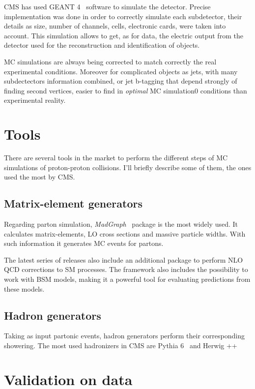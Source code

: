 CMS has used GEANT 4~\cite{Agostinelli:2002hh} software to simulate the detector. Precise implementation was done in order to correctly simulate each subdetector, their details as size, number of channels, cells, electronic cards, were taken into account. This simulation allows to get, as for data, the electric output from the detector used for the reconstruction and identification of objects. 

MC simulations are always being corrected to match correctly the real experimental conditions. Moreover for complicated objects as jets, with many subdectectors information combined, or jet b-tagging that depend strongly of finding second vertices, easier to find in \textit{optimal} MC simulation0 conditions than experimental reality.

\section{Tools}
\label{sec:tools}

There are several tools in the market to perform the different steps of MC simulations of proton-proton collisions. I'll briefly describe some of them, the ones used the most by CMS.

\subsection{Matrix-element generators}
\label{sec:ME}

Regarding parton simulation, \textit{MadGraph}~\cite{Alwall:2014hca} package is the most widely used. It calculates matrix-elements, LO cross sections and massive particle widths. With such information it generates MC events for partons. 

The latest series of releases also include an additional package to perform NLO QCD corrections to SM processes. The framework also includes the possibility to work with BSM models, making it a powerful tool for evaluating predictions from these models. 

\subsection{Hadron generators}
\label{sec:Had}

Taking as input partonic events, hadron generators perform their corresponding showering. The most used hadronizers in CMS are Pythia 6~\cite{Sjostrand:2006za} and Herwig ++

\section{Validation on data}
\label{sec:val}

